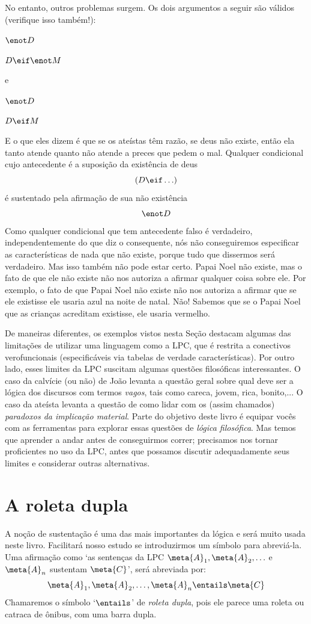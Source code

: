 No entanto, outros problemas surgem.
Os dois argumentos a seguir são válidos (verifique isso também!):
	\begin{earg}
		\item[] $\enot D$
		\item[\therefore] $D \eif \enot M$
	\end{earg}
e
	\begin{earg}
		\item[] $\enot D$
		\item[\therefore] $D \eif M$
	\end{earg}
E o que eles dizem é que se os ateístas têm razão, se deus não existe, então ela tanto atende quanto não atende a preces que pedem o mal.
Qualquer condicional cujo antecedente é a suposição da existência de deus
$$(D \eif \ldots)$$
é sustentado pela afirmação de sua não existência
$$\enot D$$
Como qualquer condicional que tem antecedente falso é verdadeiro, independentemente do que diz o consequente,
nós não conseguiremos especificar as características de nada que não existe, porque tudo que dissermos será verdadeiro.
Mas isso também não pode estar certo.
Papai Noel não existe, mas o fato de que ele não existe não nos autoriza a afirmar qualquer coisa sobre ele.
Por exemplo, o fato de que Papai Noel não existe não nos autoriza a afirmar que se ele existisse ele usaria azul na noite de natal.
Não!
Sabemos que se o Papai Noel que as crianças acreditam existisse, ele usaria vermelho.
                
De maneiras diferentes, os exemplos vistos nesta Seção destacam algumas das limitações de utilizar uma linguagem como a LPC, que é restrita a conectivos verofuncionais (especificáveis via tabelas de verdade características).
Por outro lado, esses limites da LPC suscitam algumas questões filosóficas interessantes.
O caso da calvície (ou não) de João levanta a questão geral sobre qual deve ser a lógica dos discursos com termos \emph{vagos}, tais como careca, jovem, rica, bonito,... 
O caso da ateísta levanta a questão de como lidar com os (assim chamados) \emph{paradoxos da implicação material}.
Parte do objetivo deste livro é equipar vocês com as ferramentas para explorar essas questões de \emph{lógica filosófica}.
Mas temos que aprender a andar antes de conseguirmos correr; precisamos nos tornar proficientes no uso da LPC, antes que possamos discutir adequadamente seus limites e considerar outras alternativas.


\section{A roleta dupla}
A noção de sustentação é uma das mais importantes da lógica e será muito usada neste livro.
Facilitará nosso estudo se introduzirmos um símbolo para abreviá-la.
Uma afirmação como `as sentenças da LPC $\meta{A}_1, \meta{A}_2, \ldots$ e $\meta{A}_n$ sustentam $\meta{C}$', será abreviada por:
	$$\meta{A}_1, \meta{A}_2, \ldots, \meta{A}_n \entails \meta{C}$$
Chamaremos o símbolo `$\entails$' de \emph{roleta dupla}, pois ele parece uma roleta ou catraca de ônibus, com uma barra dupla.

